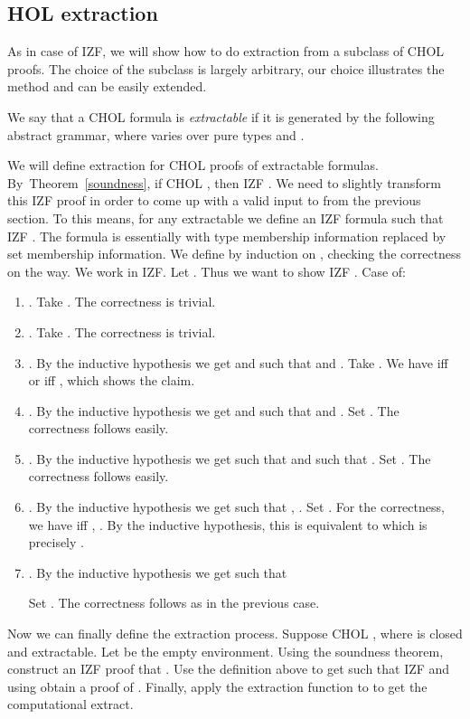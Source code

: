 \documentclass{LMCS}
\begin{document}
\subsection{HOL extraction}

As in case of IZF, we will show how to do extraction from a subclass of CHOL
proofs. The choice of the subclass is largely arbitrary, our choice
illustrates the method and can be easily extended.

We say that a CHOL formula is \emph{extractable} if it is generated by the
following abstract grammar, where  varies over pure  types and . 

\newcommand{\ppp}{{\rho[a_1:=b_1,{\ldots} , a_n:=b_n]}}
\newcommand{\srr}[1]{\SB{#1}_{\rho'}}
We will define extraction for CHOL proofs of extractable formulas.
By~Theorem~\ref{soundness}, if CHOL , then
IZF . We need to slightly transform this IZF proof 
in order to come up with a valid input to  from the previous section. To
this means, for any extractable  we define an
IZF formula  such that IZF . The formula  is essentially  with type membership information replaced by set membership information. We define  by induction on
, checking the correctness on the way. We work in IZF. Let . Thus we want to show IZF . Case  of:
\begin{enumerate}[]
\item . Take . The correctness is trivial. 
\item . Take . The correctness is trivial. 
\item . By the inductive hypothesis we get  and
 such that  and . Take .
We have  iff 
 or  iff , which
shows the claim.
\item . By the inductive hypothesis we get  and
 such that  and .
Set . The correctness follows easily. 
\item . By the inductive hypothesis we get 
such that  and 
 such that . Set . The correctness follows easily. 
\item .
By the inductive hypothesis we get  such
that , . Set . For the correctness,
we have  iff , . By the inductive
hypothesis, this is equivalent to  which is precisely . 
\item .
By the inductive hypothesis we get  such
that 

 Set . The correctness follows
as in the previous case. 
\end{enumerate}

Now we can finally define the extraction process. Suppose CHOL , where 
is closed and extractable. Let  be the empty environment. Using the soundness theorem, construct an IZF proof  that . Use the definition above to get  such that IZF  and using  obtain a proof  of .
Finally, apply the extraction function  to  to get the computational extract.
\end{document}
